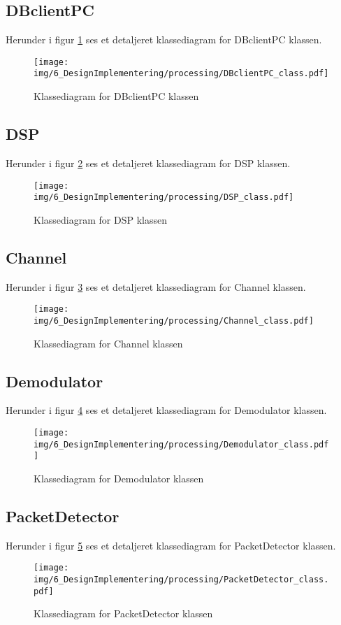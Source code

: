 \begin{appendices}
\subsection{DBclientPC}
Herunder i figur \ref{fig:DBclientPC_class} ses et detaljeret klassediagram for DBclientPC klassen.
\begin{figure}[H]
	\centering
	\texttt{[image: img/6\_DesignImplementering/processing/DBclientPC\_class.pdf]}
	\caption{Klassediagram for DBclientPC klassen}
	\label{fig:DBclientPC_class}
\end{figure}

\pagebreak

\subsection{DSP}
Herunder i figur \ref{fig:DSP_class} ses et detaljeret klassediagram for DSP klassen.
\begin{figure}[H]
	\centering
	\texttt{[image: img/6\_DesignImplementering/processing/DSP\_class.pdf]}
	\caption{Klassediagram for DSP klassen}
	\label{fig:DSP_class}
\end{figure}

\pagebreak


\subsection{Channel}
Herunder i figur \ref{fig:Channel_class} ses et detaljeret klassediagram for Channel klassen.
\begin{figure}[H]
	\centering
	\texttt{[image: img/6\_DesignImplementering/processing/Channel\_class.pdf]}
	\caption{Klassediagram for Channel klassen}
	\label{fig:Channel_class}
\end{figure}

\pagebreak
\subsection{Demodulator}
Herunder i figur \ref{fig:Demodulator_class} ses et detaljeret klassediagram for Demodulator klassen.
\begin{figure}[H]
	\centering
	\texttt{[image: img/6\_DesignImplementering/processing/Demodulator\_class.pdf]}
	\caption{Klassediagram for Demodulator klassen}
	\label{fig:Demodulator_class}
\end{figure}

\pagebreak
\subsection{PacketDetector}
Herunder i figur \ref{fig:PacketDetector_class} ses et detaljeret klassediagram for PacketDetector klassen.
\begin{figure}[H]
	\centering
	\texttt{[image: img/6\_DesignImplementering/processing/PacketDetector\_class.pdf]}
	\caption{Klassediagram for PacketDetector klassen}
	\label{fig:PacketDetector_class}
\end{figure}


\end{appendices}
